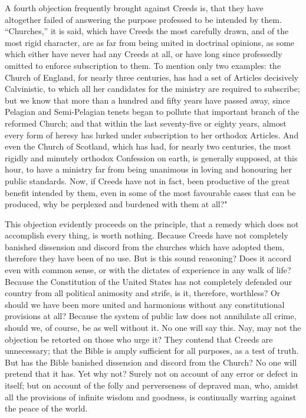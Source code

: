 \documentclass[
]{book}
\begin{document}
A fourth objection frequently brought against Creeds is, that they have altogether failed of answering the purpose professed to be intended by them. ``Churches,'' it is said, which have Creeds the most carefully drawn, and of the most rigid character, are as far from being united in doctrinal opinions, as some which either have never had any Creeds at all, or have long since professedly omitted to enforce subscription to them. To mention only two examples: the Church of England, for nearly three centuries, has had a set of Articles decisively Calvinistic, to which all her candidates for the ministry are required to subscribe; but we know that more than a hundred and fifty years have passed away, since Pelagian and Semi-Pelagian tenets began to pollute that important branch of the reformed Church; and that within the last seventy-five or eighty years, almost every form of heresy has lurked under subscription to her orthodox Articles. And even the Church of Scotland, which has had, for nearly two centuries, the most rigidly and minutely orthodox Confession on earth, is generally supposed, at this hour, to have a ministry far from being unanimous in loving and honouring her public standards. Now, if Creeds have not in fact, been productive of the great benefit intended by them, even in some of the most favourable cases that can be produced, why be perplexed and burdened with them at all?"

This objection evidently proceeds on the principle, that a remedy which does not accomplish every thing, is worth nothing. Because Creeds have not completely banished dissension and discord from the churches which have adopted them, therefore they have been of no use. But is this sound reasoning? Does it accord even with common sense, or with the dictates of experience in any walk of life? Because the Constitution of the United States has not completely defended our country from all political animosity and strife, is it, therefore, worthless? Or should we have been more united and harmonious without any constitutional provisions at all? Because the system of public law does not annihilate all crime, should we, of course, be as well without it. No one will say this. Nay, may not the objection be retorted on those who urge it? They contend that Creeds are unnecessary; that the Bible is amply sufficient for all purposes, as a test of truth. But has the Bible banished dissension and discord from the Church? No one will pretend that it has. Yet why not? Surely not on account of any error or defect in itself; but on account of the folly and perverseness of depraved man, who, amidst all the provisions of infinite wisdom and goodness, is continually warring against the peace of the world.
\end{document}

